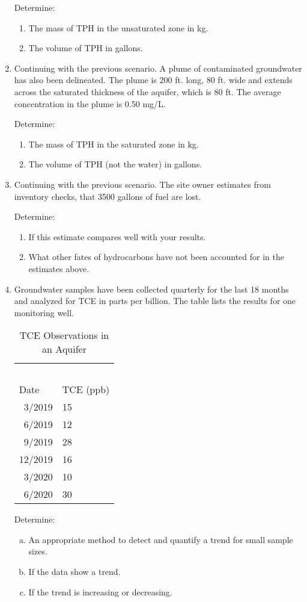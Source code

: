 \documentclass[12pt]{article}
\begin{document}
\begin{enumerate}
Determine:
\begin{enumerate}
\item The mass of TPH in the unsaturated zone in kg.
\item The volume of TPH in gallons.
\end{enumerate}

\clearpage
\item Continuing with the previous scenario. A plume of contaminated groundwater has also been delineated.  The plume is 200 ft. long, 80 ft. wide and extends across the saturated thickness of the aquifer, which is 80 ft.  The average concentration in the plume is 0.50 mg/L.

Determine:
\begin{enumerate}
\item The mass of TPH in the saturated zone in kg.
\item The volume of TPH (not the water) in gallons.
\end{enumerate}

\clearpage
\item Continuing with the previous scenario. The site owner estimates from inventory checks, that 3500 gallons of fuel are lost.  

Determine:
\begin{enumerate}
\item If this estimate compares well with your results.
\item What other fates of hydrocarbons have not been accounted for in the estimates above.
\end{enumerate}

\clearpage %
\item Groundwater samples have been collected quarterly for the last 18 months and analyzed for TCE in parts per billion.  The table lists the results for one monitoring well.

\begin{table}[htbp]
\centering
\caption{TCE Observations in an Aquifer}
\begin{tabular}{p{1.5in}p{1.5in}} %
~&~\\
Date&TCE (ppb)\\
\hline
\hline
~3/2019&15\\
~6/2019&12\\
~9/2019&28\\
12/2019&16\\
~3/2020&10\\
~6/2020&30\\
\hline
\end{tabular}
\label{tab:TCEobserve}
\end{table}

Determine:
\begin{enumerate}[a)]
\item An appropriate method to detect and quantify a trend for small sample sizes.
\item If the data show a trend.
\item If the trend is increasing or decreasing.
\end{enumerate}
\clearpage %

\end{enumerate}
\end{document}
